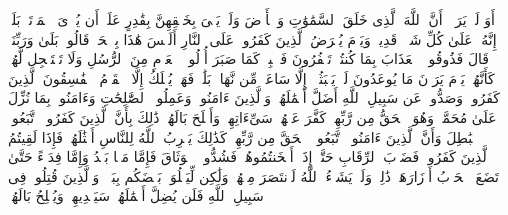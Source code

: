 \stopbuffer%
\startbuffer[\q:46:33]
أَوَ لَمۡ یَرَوۡا۟ أَنَّ ٱللَّهَ ٱلَّذِی خَلَقَ ٱلسَّمَٰوَٰتِ وَٱلۡأَرۡضَ وَلَمۡ یَعۡیَ بِخَلۡقِهِنَّ بِقَٰدِرٍ عَلَىٰۤ أَن یُحۡۦِیَ ٱلۡمَوۡتَىٰۚ بَلَىٰۤۚ إِنَّهُۥ عَلَىٰ كُلِّ شَیۡءࣲ قَدِیرࣱ%
\stopbuffer%
\startbuffer[\q:46:34]
وَیَوۡمَ یُعۡرَضُ ٱلَّذِینَ كَفَرُوا۟ عَلَى ٱلنَّارِ أَلَیۡسَ هَٰذَا بِٱلۡحَقِّۖ قَالُوا۟ بَلَىٰ وَرَبِّنَاۚ قَالَ فَذُوقُوا۟ ٱلۡعَذَابَ بِمَا كُنتُمۡ تَكۡفُرُونَ%
\stopbuffer%
\startbuffer[\q:46:35]
فَٱصۡبِرۡ كَمَا صَبَرَ أُو۟لُوا۟ ٱلۡعَزۡمِ مِنَ ٱلرُّسُلِ وَلَا تَسۡتَعۡجِل لَّهُمۡۚ كَأَنَّهُمۡ یَوۡمَ یَرَوۡنَ مَا یُوعَدُونَ لَمۡ یَلۡبَثُوۤا۟ إِلَّا سَاعَةࣰ مِّن نَّهَارِۭۚ بَلَٰغࣱۚ فَهَلۡ یُهۡلَكُ إِلَّا ٱلۡقَوۡمُ ٱلۡفَٰسِقُونَ%
\stopbuffer%
\startbuffer[\q:47:1]
ٱلَّذِینَ كَفَرُوا۟ وَصَدُّوا۟ عَن سَبِیلِ ٱللَّهِ أَضَلَّ أَعۡمَٰلَهُمۡ%
\stopbuffer%
\startbuffer[\q:47:2]
وَٱلَّذِینَ ءَامَنُوا۟ وَعَمِلُوا۟ ٱلصَّٰلِحَٰتِ وَءَامَنُوا۟ بِمَا نُزِّلَ عَلَىٰ مُحَمَّدࣲ وَهُوَ ٱلۡحَقُّ مِن رَّبِّهِمۡ كَفَّرَ عَنۡهُمۡ سَیِّءَاتِهِمۡ وَأَصۡلَحَ بَالَهُمۡ%
\stopbuffer%
\startbuffer[\q:47:3]
ذَٰلِكَ بِأَنَّ ٱلَّذِینَ كَفَرُوا۟ ٱتَّبَعُوا۟ ٱلۡبَٰطِلَ وَأَنَّ ٱلَّذِینَ ءَامَنُوا۟ ٱتَّبَعُوا۟ ٱلۡحَقَّ مِن رَّبِّهِمۡۚ كَذَٰلِكَ یَضۡرِبُ ٱللَّهُ لِلنَّاسِ أَمۡثَٰلَهُمۡ%
\stopbuffer%
\startbuffer[\q:47:4]
فَإِذَا لَقِیتُمُ ٱلَّذِینَ كَفَرُوا۟ فَضَرۡبَ ٱلرِّقَابِ حَتَّىٰۤ إِذَاۤ أَثۡخَنتُمُوهُمۡ فَشُدُّوا۟ ٱلۡوَثَاقَ فَإِمَّا مَنَّۢا بَعۡدُ وَإِمَّا فِدَاۤءً حَتَّىٰ تَضَعَ ٱلۡحَرۡبُ أَوۡزَارَهَاۚ ذَٰلِكَۖ وَلَوۡ یَشَاۤءُ ٱللَّهُ لَٱنتَصَرَ مِنۡهُمۡ وَلَٰكِن لِّیَبۡلُوَا۟ بَعۡضَكُم بِبَعۡضࣲۗ وَٱلَّذِینَ قُتِلُوا۟ فِی سَبِیلِ ٱللَّهِ فَلَن یُضِلَّ أَعۡمَٰلَهُمۡ%
\stopbuffer%
\startbuffer[\q:47:5]
سَیَهۡدِیهِمۡ وَیُصۡلِحُ بَالَهُمۡ%
\stopbuffer%
